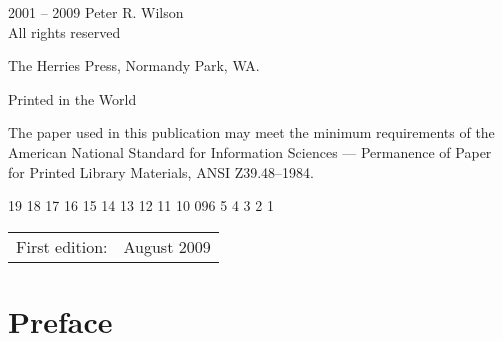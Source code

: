 \documentclass[10pt,a4paper,extrafontsizes]{memoir}
\begin{document}
\begingroup
\footnotesize
\setlength{\parindent}{0pt}
\setlength{\parskip}{\baselineskip}
\textcopyright{} 2001 -- 2009 Peter R. Wilson \\
All rights reserved

The Herries Press, Normandy Park, WA.

Printed in the World 

The paper used in this publication may meet the minimum requirements
of the American National Standard for Information 
Sciences --- Permanence of Paper for Printed Library Materials, 
ANSI Z39.48--1984.

\begin{center}
19 18 17 16 15 14 13 12 11 10 09\hspace{2em}6 5 4 3 2 1
\end{center}
\begin{center}
\begin{tabular}{ll}
First edition:                        & August 2009 \\
\end{tabular}
\end{center}

\endgroup

\clearpage
\mbox{}

\cleardoublepage

\pagestyle{headings}

\setupshorttoc
\tableofcontents
\cleardoublepage
\setupparasubsecs
\setupmaintoc
\tableofcontents
\setlength{\unitlength}{1pt}
\clearpage 
\listoffigures
\clearpage
\listoftables
\clearpage

\chapter{Preface}
\end{document}

